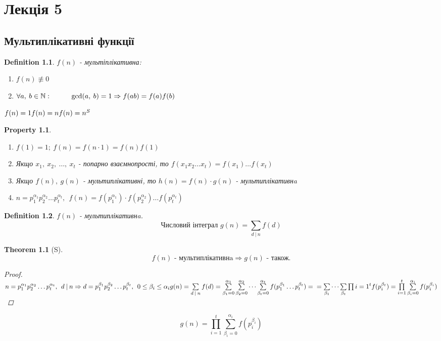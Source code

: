 \documentclass[a4paper,12pt, centered]{bookest}
\newtheorem{theorem}{Theorem}[section]
\newtheorem{definition}{Definition}[section]
\newtheorem*{property*}{Property}
\newcommand\tab[1][1cm]{\hspace*{#1}}
\begin{document}
\chapter{Лекція 5}
\section{Мультиплікативні функції}
\begin{definition}$f(n)$ - мультіплікативна:
	\begin{enumerate}
	\item $f(n)\not\equiv0$
	\item $\forall a,\>b\in\mathbb{N}:\tab \gcd(a,\>b)=1\Rightarrow f(ab)=f(a)f(b)$
\end{enumerate}
\end{definition}
\begin{example}
$\\f(n)=1\\f(n)=n\\f(n)=n^S$	
\end{example}
\begin{property*}$ $
	\begin{enumerate}
		\item $f(1)=1;\>f(n)=f(n\cdot 1)=f(n)f(1)$
		\item Якщо $x_1,\>x_2,\>\dots,\>x_t$ - попарно взаємнопрості, то $f(x_1 x_2 \dots x_t)=f(x_1)\dots f(x_t)$ 
		\item Якщо $f(n),\>g(n)$ - мультиплікативні, то $h(n)=f(n)\cdot g(n)$ -  мультиплікативнa
		\item $n=p_1^{\alpha_1}p_2^{\alpha_2}\dots p_t^{\alpha_t},\>\>f(n)=f(p_1^{\alpha_1})\cdot f(p_2^{\alpha_2})\dots f(p_t^{\alpha_t})$
	\end{enumerate}
\end{property*}
\begin{definition}
	$f(n)$ - мультиплікативнa. $$\textrm{Числовий інтеграл }g(n)=\sum\limits_{d\>|\>n}f(d)$$
\end{definition}
\begin{theorem}[S]
\label{S}
	$$f(n)\textrm{ - мультиплікативнa}\Rightarrow g(n) \textrm{ - також.}$$
	\begin{proof}
		$\\n=p_1^{\alpha_1}p_2^{\alpha_2}\dots p_t^{\alpha_t},\>\> d\>|\>n\Rightarrow d=p_1^{\beta_1}p_2^{\beta_2}\dots p_t^{\beta_t},\>\>0\leq \beta_i\leq\alpha_i\\g(n)= \sum\limits_{d\>|\>n}f(d)=\sum\limits_{\beta_1=0}^{\alpha_1}\sum\limits_{\beta_2=0}^{\alpha_2}\dots\sum\limits_{\beta_t=0}^{\alpha_t}f(p_1^{\beta_1}\dots p_t^{\beta_t})=\\=\sum\limits_{\beta_1}\dots\sum\limits_{\beta_t}\prod\limits{i=1}^{t}f(p_i^{\beta_t})=\prod\limits_{i=1}^{t}\sum\limits_{\beta_i=0}^{\alpha_i}f(p_i^{\beta_i})$
	\end{proof}
\end{theorem}
$$g(n)=\prod\limits_{i=1}^{t}\sum\limits_{\beta_i=0}^{\alpha_i}f(p_i^{\beta_i})$$
\end{document}
